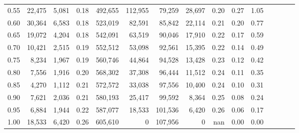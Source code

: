 \begin{tabular}{rrrcrrrrrrrrrrr}
0.55 &   22,475 &   5,081 &                                       0.18 &  492,655 &  112,955 &   79,259 &   28,697 &  0.20 &  0.27 &                         1.05 \\
0.60 &   30,364 &   6,583 &                                       0.18 &  523,019 &   82,591 &   85,842 &   22,114 &  0.21 &  0.20 &                         0.77 \\
0.65 &   19,072 &   4,204 &                                       0.18 &  542,091 &   63,519 &   90,046 &   17,910 &  0.22 &  0.17 &                         0.59 \\
0.70 &   10,421 &   2,515 &                                       0.19 &  552,512 &   53,098 &   92,561 &   15,395 &  0.22 &  0.14 &                         0.49 \\
0.75 &    8,234 &   1,967 &                                       0.19 &  560,746 &   44,864 &   94,528 &   13,428 &  0.23 &  0.12 &                         0.42 \\
0.80 &    7,556 &   1,916 &                                       0.20 &  568,302 &   37,308 &   96,444 &   11,512 &  0.24 &  0.11 &                         0.35 \\
0.85 &    4,270 &   1,112 &                                       0.21 &  572,572 &   33,038 &   97,556 &   10,400 &  0.24 &  0.10 &                         0.31 \\
0.90 &    7,621 &   2,036 &                                       0.21 &  580,193 &   25,417 &   99,592 &    8,364 &  0.25 &  0.08 &                         0.24 \\
0.95 &    6,884 &   1,944 &                                       0.22 &  587,077 &   18,533 &  101,536 &    6,420 &  0.26 &  0.06 &                         0.17 \\
1.00 &   18,533 &   6,420 &                                       0.26 &  605,610 &        0 &  107,956 &        0 &   nan &  0.00 &                         0.00 \\
\bottomrule
\end{tabular}
